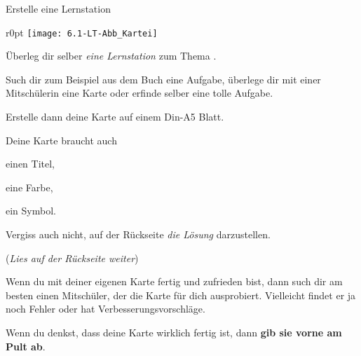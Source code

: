 \documentclass[lerntheke,12pt,a5paper,landscape]{arbeitsblatt}
\begin{document}
	\begin{karte3}[\iconPartner]{Erstelle eine Lernstation}
		\bigskip

		\begin{wrapfigure}{r}{0pt}
			\texttt{[image: 6.1-LT-Abb\_Kartei]}
		\end{wrapfigure}
		Überleg dir selber \emph{eine Lernstation} zum Thema \emph{\Titel}.

		Such dir zum Beispiel aus dem Buch eine Aufgabe, überlege dir mit einer Mitschülerin eine Karte oder erfinde selber eine tolle Aufgabe.

		Erstelle dann deine Karte auf einem Din-A5 Blatt.

		Deine Karte braucht auch
		\begin{smallitem}
			\item einen Titel,
			\item eine Farbe,
			\item ein Symbol.
		\end{smallitem}

		Vergiss auch nicht, auf der Rückseite \emph{die Lösung} darzustellen.

		\bigskip
		(\textit{Lies auf der Rückseite weiter})

	\end{karte3}

	\begin{loesungskarte}
		Wenn du mit deiner eigenen Karte fertig und zufrieden bist, dann such dir am besten einen Mitschüler, der die Karte für dich ausprobiert. Vielleicht findet er ja noch Fehler oder hat Verbesserungsvorschläge.

		\bigskip
		Wenn du denkst, dass deine Karte wirklich fertig ist, dann \textbf{gib sie vorne am Pult ab}.
	\end{loesungskarte}
\end{document}
